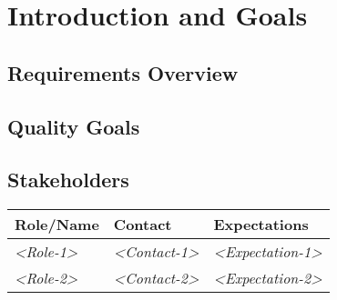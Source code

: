 \documentclass[]{article}
\begin{document}
\section{Introduction and Goals}\label{section-introduction-and-goals}

\subsection{Requirements Overview}\label{_requirements_overview}

\subsection{Quality Goals}\label{_quality_goals}

\subsection{Stakeholders}\label{_stakeholders}

\begin{longtable}[]{@{}lll@{}}
\toprule
\begin{minipage}[b]{0.18\columnwidth}\raggedright\strut
Role/Name\strut
\end{minipage} & \begin{minipage}[b]{0.37\columnwidth}\raggedright\strut
Contact\strut
\end{minipage} & \begin{minipage}[b]{0.37\columnwidth}\raggedright\strut
Expectations\strut
\end{minipage}\tabularnewline
\midrule
\endhead
\begin{minipage}[t]{0.18\columnwidth}\raggedright\strut
\emph{\textless{}Role-1\textgreater{}}\strut
\end{minipage} & \begin{minipage}[t]{0.37\columnwidth}\raggedright\strut
\emph{\textless{}Contact-1\textgreater{}}\strut
\end{minipage} & \begin{minipage}[t]{0.37\columnwidth}\raggedright\strut
\emph{\textless{}Expectation-1\textgreater{}}\strut
\end{minipage}\tabularnewline
\begin{minipage}[t]{0.18\columnwidth}\raggedright\strut
\emph{\textless{}Role-2\textgreater{}}\strut
\end{minipage} & \begin{minipage}[t]{0.37\columnwidth}\raggedright\strut
\emph{\textless{}Contact-2\textgreater{}}\strut
\end{minipage} & \begin{minipage}[t]{0.37\columnwidth}\raggedright\strut
\emph{\textless{}Expectation-2\textgreater{}}\strut
\end{minipage}\tabularnewline
\bottomrule
\end{longtable}
\end{document}
